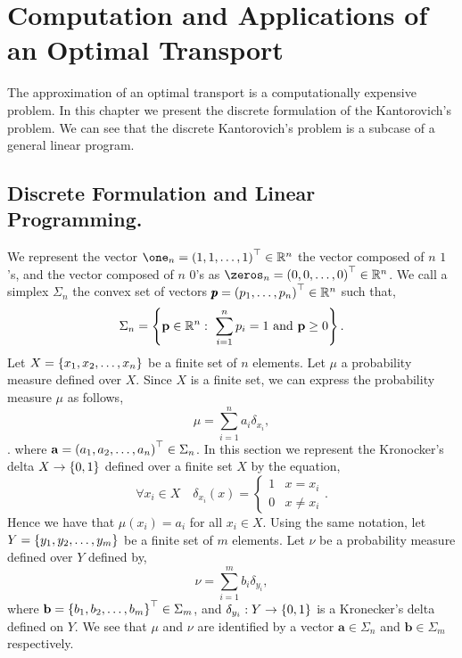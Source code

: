 \chapter{Computation and Applications of an Optimal Transport}
The approximation of an optimal transport is a computationally expensive problem.  In this chapter we present the discrete formulation of the Kantorovich's problem. We can see that the discrete Kantorovich's problem is a subcase of a general linear program.
\section{Discrete Formulation and Linear Programming.}
We represent the vector $\one_n=\parentheses{1,1,\dots,1}^\top\in \Real^n$ the vector composed of $n$ $1$'s, and the vector composed of $n$ $0$'s as $\zeros_n=\parentheses{0,0,\dots, 0}^\top\in\Real^n$. We call a simplex $\Sigma_n$ the convex set of vectors $\pmb{p}=\left( p_1, \dots, p_n \right)^\top\in \mathbb{R}^n$ such that, 
\begin{equation}
	\Sigma_n=\braces{\mathbf{p} \in \Real^n: \ \sum_{i=1}^{n}{p_i}=1\ \mand\ \mathbf{p}\geq 0 }.
\end{equation}
Let $X=\left\lbrace x_1, x_2, \dots, x_n \right\rbrace$ be a finite set of $n$ elements. Let $\mu$ a probability measure defined over $X$. Since $X$ is a finite set, we can express the probability measure $\mu$ as follows,
\begin{equation}
	\mu=\sum_{i=1}^{n} a_i \delta_{x_i},
\end{equation}.
where $\mathbf{a}=\left( a_1, a_2, \dots, a_n \right)^\top \in \Sigma_n$. In this section we represent the Kronocker's delta $X\to \left\lbrace 0,1 \right\rbrace$ defined over a finite set $X$ by the equation,
\begin{equation*}
\forall x_i\in X\quad	\delta_{x_i}(x)=\begin{cases}
	1 & x=x_i \\
	0 & x\neq x_i
	\end{cases}.
\end{equation*}  
Hence we have that $\mu(x_i)=a_i$ for all $x_i\in X$. Using the same notation, let $Y=\left\lbrace y_1, y_2, \dots, y_m \right\rbrace$ be a finite set of $m$ elements. Let $\nu$ be a probability measure defined over $Y$ defined by,
\begin{equation}
	\nu=\sum_{i=1}^{m} b_i \delta_{y_i},
\end{equation}
where $\mathbf{b}=\left\lbrace b_1, b_2, \dots, b_m \right\rbrace^\top\in \Sigma_m$,  and $\delta_{y_i}: Y\to\left\lbrace 0,1 \right\rbrace$ is a Kronecker's delta defined on $Y$. We see that $\mu$ and $\nu$ are identified by a vector $\mathbf{a}\in \Sigma_n$ and $\mathbf{b}\in \Sigma_m$ respectively. 

